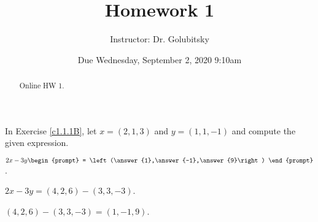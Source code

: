 \documentclass{ximera}
\title{Homework 1}
\author{Instructor: Dr. Golubitsky}
\date{Due Wednesday, September 2, 2020 \@ 9:10am}
\begin{document}
\begin{abstract}
Online HW 1.
\end{abstract}
\maketitle


\problemlabel

\noindent In Exercise \ref{c1.1.1B}, let $x=(2,1,3)$ and 
$y=(1,1,-1)$ and compute the given expression.


\begin{exercise}  \label{c1.1.1B}
  $2x-3y\begin{prompt}
    = \left(\answer{1},\answer{-1},\answer{9}\right)
  \end{prompt}$.
  \begin{hint}
    $2x - 3y = (4,2,6) - (3,3,-3)$.
  \end{hint}
  \begin{hint}
    $(4,2,6) - (3,3,-3) = (1,-1,9)$.
  \end{hint}  

%
\end{exercise}





\problemlabel
\end{document}
